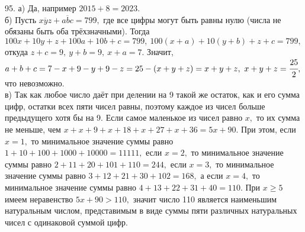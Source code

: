 95. а) Да, например $2015+8=2023.$\\
б) Пусть $\overline{xyz}+\overline{abc}=799,$ где все цифры могут быть равны нулю (числа не обязаны быть оба трёхзначными). Тогда $100x+10y+z+100a+10b+c=799,\
100(x+a)+10(y+b)+z+c=799,$ откуда $z+c=9,\ y+b=9,\ x+a=7.$ Значит, $a+b+c=7-x+9-y+9-z=25-(x+y+z)=x+y+z,\ x+y+z=\cfrac{25}{2},$ что невозможно.\\
в) Так как любое число даёт при делении на 9 такой же остаток, как и его сумма цифр, остатки всех пяти чисел равны, поэтому каждое из чисел больше предыдущего хотя бы на 9. Если самое маленькое из чисел равно $x,$ то их сумма не меньше, чем $x+x+9+x+18+x+27+x+36=5x+90.$ При этом, если $x=1,$ то минимальное значение суммы равно $1+10+100+1000+10000=11111,$ если $x=2,$ то минимальное значение суммы равно $2+11+20+101+110=244,$ если $x=3,$ то минимальное значение суммы равно $3+12+21+30+102=168,$ а если $x=4,$ то минимальное значение суммы равно $4+13+22+31+40=110.$ При $x\geqslant5$ имеем неравенство $5x+90>110,$ значит число 110 является наименьшим натуральным числом, представимым в виде суммы пяти различных натуральных чисел с одинаковой суммой цифр.\\
